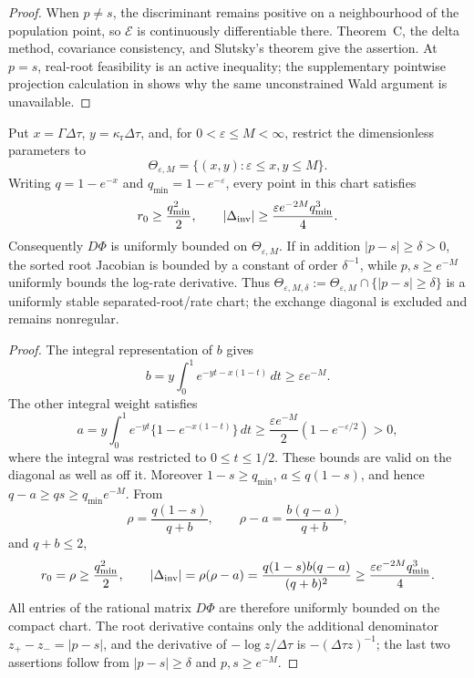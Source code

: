 \begin{proof}
When \(p\ne s\), the discriminant remains positive on a neighbourhood of the
population point, so \(\mathcal E\) is continuously differentiable there.
Theorem~C, the delta method, covariance consistency, and Slutsky's theorem give
the assertion.  At \(p=s\), real-root feasibility is an active inequality;
the supplementary pointwise projection calculation in
 shows why the same
unconstrained Wald argument is unavailable.
\end{proof}

\begin{proposition}\label{prop:stable-quotient-chart-main}
Put \(x=\Gamma\Delta\tau\), \(y=\kappa_{\mathrm r}\Delta\tau\), and, for
\(0<\varepsilon\le M<\infty\), restrict the dimensionless parameters to
\[
\Theta_{\varepsilon,M}=\{(x,y):\varepsilon\le x,y\le M\}.
\]
Writing \(q=1-e^{-x}\) and \(q_{\min}=1-e^{-\varepsilon}\), every point in
this chart satisfies
\[
r_0\ge \frac{q_{\min}^2}{2},\qquad
|\Delta_{\rm inv}|
\ge \frac{\varepsilon e^{-2M}q_{\min}^3}{4}.
\]
Consequently \(D\Phi\) is uniformly bounded on
\(\Theta_{\varepsilon,M}\).  If in addition \(|p-s|\ge\delta>0\), the sorted
root Jacobian is bounded by a constant of order \(\delta^{-1}\), while
\(p,s\ge e^{-M}\) uniformly bounds the log-rate derivative.  Thus
\(\Theta_{\varepsilon,M,\delta}:=\Theta_{\varepsilon,M}\cap
\{|p-s|\ge\delta\}\) is a uniformly stable separated-root/rate chart; the
exchange diagonal is excluded and remains nonregular.
\end{proposition}

\begin{proof}
The integral representation of \(b\) gives
\[
b=y\int_0^1e^{-yt-x(1-t)}\,dt\ge \varepsilon e^{-M}.
\]
The other integral weight satisfies
\[
a=y\int_0^1e^{-yt}\{1-e^{-x(1-t)}\}\,dt
\ge \frac{\varepsilon e^{-M}}2(1-e^{-\varepsilon/2})>0,
\]
where the integral was restricted to \(0\le t\le1/2\).  These bounds are
valid on the diagonal as well as off it.
Moreover \(1-s\ge q_{\min}\), \(a\le q(1-s)\), and hence
\(q-a\ge qs\ge q_{\min}e^{-M}\).  From
\[
\rho=\frac{q(1-s)}{q+b},\qquad
\rho-a=\frac{b(q-a)}{q+b},
\]
and \(q+b\le2\),
\[
r_0=\rho\ge\frac{q_{\min}^2}{2},\qquad
|\Delta_{\rm inv}|=\rho(\rho-a)
=\frac{q(1-s)b(q-a)}{(q+b)^2}
\ge\frac{\varepsilon e^{-2M}q_{\min}^3}{4}.
\]
All entries of the rational matrix \(D\Phi\) are therefore uniformly bounded
on the compact chart.  The root derivative contains only the additional
denominator \(z_+-z_-=|p-s|\), and the derivative of
\(-\log z/\Delta\tau\) is \(-(\Delta\tau z)^{-1}\); the last two assertions
follow from \(|p-s|\ge\delta\) and \(p,s\ge e^{-M}\).
\end{proof}

